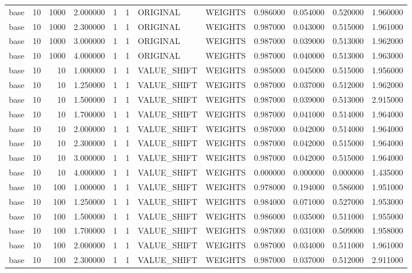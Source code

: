 \begin{tabular}{lrrrllllrrrr}
base & 10 & 1000 & 2.000000 & 1 & 1 & ORIGINAL & WEIGHTS & 0.986000 & 0.054000 & 0.520000 & 1.960000 \\
base & 10 & 1000 & 2.300000 & 1 & 1 & ORIGINAL & WEIGHTS & 0.987000 & 0.043000 & 0.515000 & 1.961000 \\
base & 10 & 1000 & 3.000000 & 1 & 1 & ORIGINAL & WEIGHTS & 0.987000 & 0.039000 & 0.513000 & 1.962000 \\
base & 10 & 1000 & 4.000000 & 1 & 1 & ORIGINAL & WEIGHTS & 0.987000 & 0.040000 & 0.513000 & 1.963000 \\
base & 10 & 10 & 1.000000 & 1 & 1 & VALUE_SHIFT & WEIGHTS & 0.985000 & 0.045000 & 0.515000 & 1.956000 \\
base & 10 & 10 & 1.250000 & 1 & 1 & VALUE_SHIFT & WEIGHTS & 0.987000 & 0.037000 & 0.512000 & 1.962000 \\
base & 10 & 10 & 1.500000 & 1 & 1 & VALUE_SHIFT & WEIGHTS & 0.987000 & 0.039000 & 0.513000 & 2.915000 \\
base & 10 & 10 & 1.700000 & 1 & 1 & VALUE_SHIFT & WEIGHTS & 0.987000 & 0.041000 & 0.514000 & 1.964000 \\
base & 10 & 10 & 2.000000 & 1 & 1 & VALUE_SHIFT & WEIGHTS & 0.987000 & 0.042000 & 0.514000 & 1.964000 \\
base & 10 & 10 & 2.300000 & 1 & 1 & VALUE_SHIFT & WEIGHTS & 0.987000 & 0.042000 & 0.515000 & 1.964000 \\
base & 10 & 10 & 3.000000 & 1 & 1 & VALUE_SHIFT & WEIGHTS & 0.987000 & 0.042000 & 0.515000 & 1.964000 \\
base & 10 & 10 & 4.000000 & 1 & 1 & VALUE_SHIFT & WEIGHTS & 0.000000 & 0.000000 & 0.000000 & 1.435000 \\
base & 10 & 100 & 1.000000 & 1 & 1 & VALUE_SHIFT & WEIGHTS & 0.978000 & 0.194000 & 0.586000 & 1.951000 \\
base & 10 & 100 & 1.250000 & 1 & 1 & VALUE_SHIFT & WEIGHTS & 0.984000 & 0.071000 & 0.527000 & 1.953000 \\
base & 10 & 100 & 1.500000 & 1 & 1 & VALUE_SHIFT & WEIGHTS & 0.986000 & 0.035000 & 0.511000 & 1.955000 \\
base & 10 & 100 & 1.700000 & 1 & 1 & VALUE_SHIFT & WEIGHTS & 0.987000 & 0.031000 & 0.509000 & 1.958000 \\
base & 10 & 100 & 2.000000 & 1 & 1 & VALUE_SHIFT & WEIGHTS & 0.987000 & 0.034000 & 0.511000 & 1.961000 \\
base & 10 & 100 & 2.300000 & 1 & 1 & VALUE_SHIFT & WEIGHTS & 0.987000 & 0.037000 & 0.512000 & 2.911000 \\

\end{tabular}
